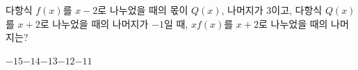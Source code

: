 다항식 $f(x)$를 $x-2$로 나누었을 때의 몫이 $Q(x)$, 나머지가 $3$이고, 다항식 $Q(x)$를 $x+2$로 나누었을 때의 나머지가 $-1$일 때, $xf(x)$를 $x+2$로 나누었을 때의 나머지는?
\begin{choices32}{$-15$}{$-14$}{$-13$}{$-12$}{$-11$}\end{choices32}
